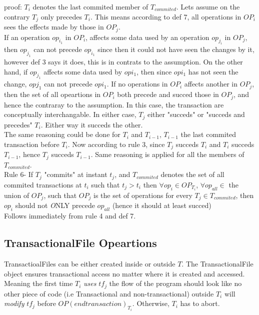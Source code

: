 \documentclass[a4paper, 11pt]{article}
\begin{document}
proof: $T_i$ denotes the last commited member of $T_{commited}$. Lets assume on the contrary $T_j$ only precedes $T_i$. This means according to def 7, all operations in $OP_i$ sees the effects made by those in $OP_j$. \\ 

If an operation $op_{i_1}$ in $OP_i$, affects some data used by an operation $op_{j_i}$ in $OP_j$, then $op_{j_1}$ can not precede $op_{i_1}$ since then it could not have seen the changes by it, however def 3 says it does, this is in contrats to the assumption. On the other hand, if $op_{j_1}$ affects some data used by $op{i_1}$, then since $op{i_1}$ has not seen the change, $op{j_1}$ can not precede $op{i_1}$. If no operations in $OP_i$ affects another in $OP_j$, then the set of all opeartions in $OP_i$ both precede and succed those in $OP_j$, and hence the contraray to the assumption. In this case, the transaction are conceptually interchangable. In either case, $T_j$ either "succeds" or "succeds and precedes" $T_i$. Either way it succeds the other. \\


The same reasoning could be done for $T_i$ and $T_{i-1}$, $T_{i-1}$ the last commited transaction before $T_{i}$. Now according to rule 3, since $T_j$ succeds $T_i$ and $T_i$ succeds $T_{i-1}$, hence $T_j$ succeds $T_{i-1}$. Same reasoning is applied for all the members of $T_{commited}$. \\ 


Rule 6- If $T_j$ "commits" at instant $t_j$, and $T_{commited}$ denotes the set of all commited transactions at $t_i$ such that $t_j > t_i$ then $\forall op_i \in OP_{T_i}$, $\forall op_{all} \in$ the union of $OP_j$, such that $OP_j$ is the set of operations  for every $T_j \in T_{commited}$, then $op_i$  should not \emph ONLY precede $op_{all}$ (hence it should at least succed)\\

Follows immediately from rule 4 and def 7. 

\subsection{TransactionalFile Opeartions}
TransactioalFiles can be either created inside or outside $T$. The TransactionalFile object ensures transactional access no matter where it is created and accessed. Meaning the first time $T_i$ \emph {uses} $tf_j$ the flow of the program should look like no other piece of code (i.e Transactional and non-transactional) outside $T_i$ will \emph {modify} $tf_j$ before $OP(endtransaction)_{T_i}$. Otherwise, $T_i$ has to abort. \\
\end{document}
